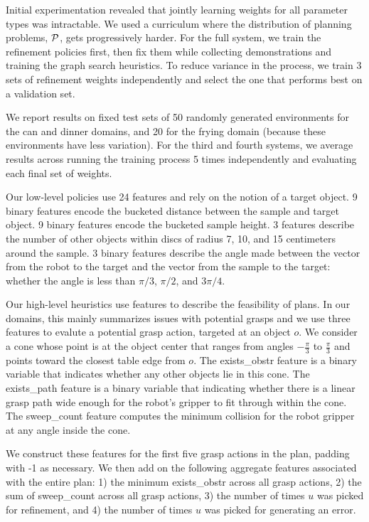 Initial experimentation revealed that jointly learning weights for all
parameter types was intractable. We used a curriculum where the
distribution of planning problems, $\mathcal{P}$, gets progressively
harder. For the full system, we train the refinement policies first,
then fix them while collecting demonstrations and training the graph
search heuristics. To reduce variance in the process, we train 3 sets
of refinement weights independently and select the one that performs
best on a validation set.

We report results on fixed test sets of 50 randomly generated
environments for the can and dinner domains, and 20 for the frying
domain (because these environments have less variation).  For the
third and fourth systems, we average results across running the
training process 5 times independently and evaluating each final set
of weights.

Our low-level policies use 24 features and rely on the notion of a
target object. 9 binary features encode the bucketed distance between
the sample and target object. 9 binary features encode the bucketed
sample height. 3 features describe the number of other objects within
discs of radius 7, 10, and 15 centimeters around the sample. 3 binary
features describe the angle made between the vector from the robot to
the target and the vector from the sample to the target: whether the
angle is less than $\pi/3$, $\pi/2$, and $3\pi/4$.

Our high-level heuristics use features to describe the feasibility of
plans. In our domains, this mainly summarizes issues with potential
grasps and we use three features to evalute a potential grasp action,
targeted at an object $o$. We consider a cone whose point is at the
object center that ranges from angles $-\frac{\pi}{3}$ to
$\frac{\pi}{3}$ and points toward the closest table edge from $o$. The
exists\_obstr feature is a binary variable that indicates whether any
other objects lie in this cone. The exists\_path feature is a binary
variable that indicating whether there is a linear grasp path wide
enough for the robot's gripper to fit through within the cone. The
sweep\_count feature computes the minimum collision for the robot
gripper at any angle inside the cone. 

We construct these features for the first five grasp actions in the
plan, padding with -1 as necessary. We then add on the following
aggregate features associated with the entire plan: 1) the minimum
exists\_obstr across all grasp actions, 2) the sum of sweep\_count
across all grasp actions, 3) the number of times $u$ was picked for
refinement, and 4) the number of times $u$ was picked for generating
an error.

